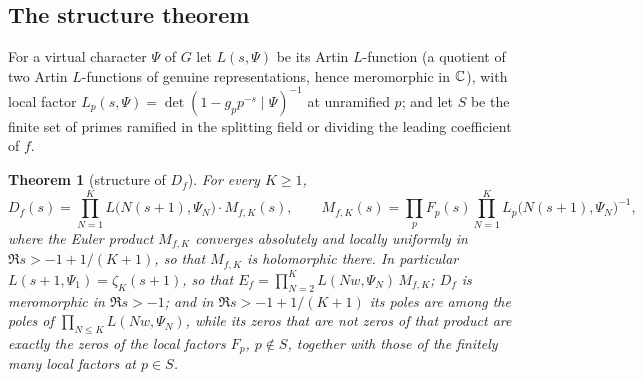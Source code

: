\documentclass[11pt,a4paper]{article}
\newtheorem{theorem}{Theorem}
\theoremstyle{remark}\newtheorem{remark}[theorem]{Remark}
\begin{document}
\subsection{The structure theorem}

For a virtual character $\Psi$ of $G$ let $L(s,\Psi)$ be its Artin $L$-function (a quotient of two
Artin $L$-functions of genuine representations, hence meromorphic in $\mathbb{C}$), with local factor
$L_p(s,\Psi)=\det(1-g_pp^{-s}\mid\Psi)^{-1}$ at unramified $p$; and let $S$ be the finite set of primes
ramified in the splitting field or dividing the leading coefficient of $f$.

\begin{theorem}[structure of $D_f$]\label{thm:structure}
For every $K\ge1$,
\begin{equation}\label{eq:structure}
D_f(s)=\prod_{N=1}^{K}L\bigl(N(s+1),\Psi_N\bigr)\cdot M_{f,K}(s),\qquad
M_{f,K}(s)=\prod_pF_p(s)\prod_{N=1}^{K}L_p\bigl(N(s+1),\Psi_N\bigr)^{-1},
\end{equation}
where the Euler product $M_{f,K}$ converges absolutely and locally uniformly in $\Re s>-1+1/(K+1)$, so
that $M_{f,K}$ is holomorphic there. In particular $L(s+1,\Psi_1)=\zeta_K(s+1)$, so that
$E_f=\prod_{N=2}^KL(Nw,\Psi_N)\,M_{f,K}$; $D_f$ is meromorphic in $\Re s>-1$; and in
$\Re s>-1+1/(K+1)$ its poles are among the poles of $\prod_{N\le K}L(Nw,\Psi_N)$, while its zeros that are not
zeros of that product are exactly the zeros of the local factors $F_p$, $p\notin S$, together with those
of the finitely many local factors at $p\in S$.
\end{theorem}
\end{document}
